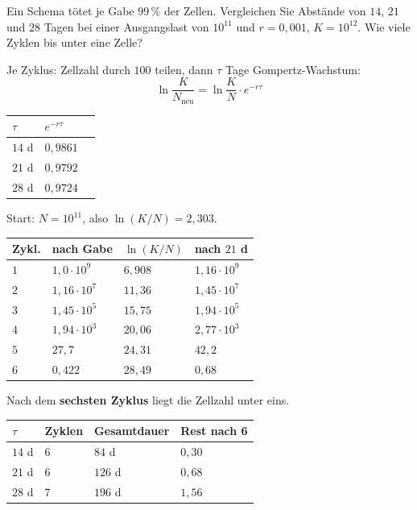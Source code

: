\begin{aufgabe}
Ein Schema tötet je Gabe $99\,\%$ der Zellen. Vergleichen Sie Abstände von $14$, $21$ und $28$ Tagen bei einer Ausgangslast von $10^{11}$ und $r = 0{,}001$, $K = 10^{12}$. Wie viele Zyklen bis unter eine Zelle?

\loesung
{}
Je Zyklus: Zellzahl durch $100$ teilen, dann $\tau$ Tage Gompertz-Wachstum:
\[ \ln\frac{K}{N_{\text{neu}}} = \ln\frac{K}{N}\cdot e^{-r\tau} \]

\begin{center}
\renewcommand{\arraystretch}{1.45}
\begin{tabular}{@{}P{1.8cm}P{2.2cm}P{2.8cm}@{}}
\toprule
$\tau$ & $e^{-r\tau}$ & \\
\midrule
$14$ d & $0{,}9861$ & \\
$21$ d & $0{,}9792$ & \\
$28$ d & $0{,}9724$ & \\
\bottomrule
\end{tabular}
\end{center}

Start: $N = 10^{11}$, also $\ln(K/N) = 2{,}303$.

\begin{center}
{\small
\renewcommand{\arraystretch}{1.44}
\begin{tabular}{@{}P{1.4cm}P{2.2cm}P{2.2cm}P{2.2cm}@{}}
\toprule
\textbf{Zykl.} & \textbf{nach Gabe} & $\ln(K/N)$ & \textbf{nach $21$ d}\\
\midrule
$1$ & $1{,}0\cdot10^{9}$ & $6{,}908$ & $1{,}16\cdot10^{9}$\\
$2$ & $1{,}16\cdot10^{7}$ & $11{,}36$ & $1{,}45\cdot10^{7}$\\
$3$ & $1{,}45\cdot10^{5}$ & $15{,}75$ & $1{,}94\cdot10^{5}$\\
$4$ & $1{,}94\cdot10^{3}$ & $20{,}06$ & $2{,}77\cdot10^{3}$\\
$5$ & $27{,}7$ & $24{,}31$ & $42{,}2$\\
$6$ & $0{,}422$ & $28{,}49$ & $0{,}68$\\
\bottomrule
\end{tabular}}
\end{center}

Nach dem \textbf{sechsten Zyklus} liegt die Zellzahl unter eins.

\begin{center}
{\small
\renewcommand{\arraystretch}{1.48}
\begin{tabular}{@{}P{1.8cm}P{2.2cm}P{2.2cm}P{2.0cm}@{}}
\toprule
$\tau$ & \textbf{Zyklen} & \textbf{Gesamtdauer} & \textbf{Rest nach 6}\\
\midrule
$14$ d & $6$ & $84$ d & $0{,}30$\\
$21$ d & $6$ & $126$ d & $0{,}68$\\
$28$ d & $7$ & $196$ d & $1{,}56$\\
\bottomrule
\end{tabular}}
\end{center}


\end{aufgabe}

